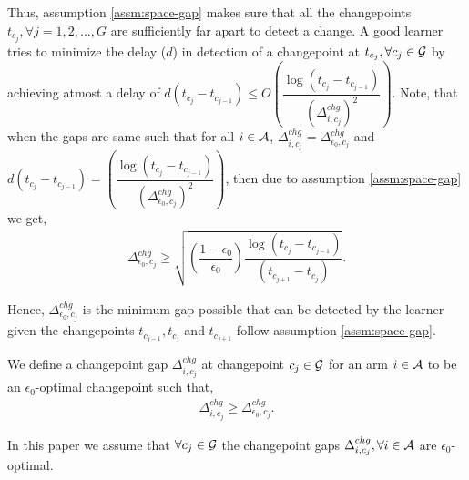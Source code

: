 \begin{discussion}
\label{dis:gap-delay}
Thus, assumption \ref{assm:space-gap} makes sure that all the changepoints $t_{c_j},\forall j=1,2,\ldots,G$ are sufficiently far apart to detect a change. A good learner tries to minimize the delay ($d$) in detection of a changepoint at $t_{c_j},\forall c_{j}\in\mathcal{G}$ by achieving atmost a delay of $d\left(t_{c_j} - t_{c_{j-1}}\right) \leq O\left( \dfrac{\log( t_{c_j} - t_{c_{j-1}} )}{(\Delta^{chg}_{i,c_j})^{2}}\right)$. Note, that when the gaps are same such that for all $i\in\mathcal{A}$, $\Delta_{i,c_j}^{chg}=\Delta_{\epsilon_0,c_j}^{chg}$ and $d\left(t_{c_j} - t_{c_{j-1}}\right) = \left( \dfrac{\log( t_{c_j} - t_{c_{j-1}} )}{(\Delta^{chg}_{\epsilon_0,c_j})^{2}}\right)$, then due to assumption \ref{assm:space-gap} we get,
\begin{align*}
\Delta_{\epsilon_0,c_j}^{chg}\geq \sqrt{\left(\dfrac{1-\epsilon_0}{\epsilon_0}\right)\dfrac{\log(t_{c_j} - t_{c_{j-1}})}{(t_{c_{j+1}} - t_{c_{j}})}}.
\end{align*} 

Hence, $\Delta_{\epsilon_0,c_j}^{chg}$ is the minimum gap possible that can be detected by the learner given the changepoints $t_{c_{j-1}}, t_{c_j}$ and $t_{c_{j+1}}$ follow assumption \ref{assm:space-gap}.

\end{discussion}



\begin{definition}
\label{Def:e-chg-gap}
We define a changepoint gap $\Delta^{chg}_{i,c_j}$ at changepoint $c_j\in\mathcal{G}$ for an arm $i\in\mathcal{A}$ to be an $\epsilon_0$-optimal changepoint such that,
\begin{align*}
\Delta^{chg}_{i,c_j} \geq \Delta_{\epsilon_0,c_j}^{chg}.
\end{align*}
\end{definition}


\begin{assumption}
\label{assm:chg-gap}
In this paper we assume that $\forall c_{j}\in\mathcal{G}$ the changepoint gaps $\Delta^{chg}_{i,c_j},\forall i\in\mathcal{A}$ are $\epsilon_0$-optimal.
\end{assumption}


